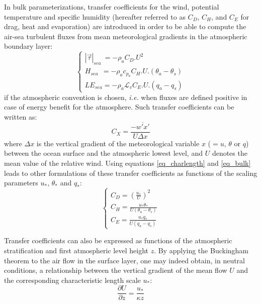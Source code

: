In bulk parameterizations, transfer coefficients for the wind, potential temperature and specific humidity 
(hereafter referred to as $C_{D}$, $C_{H}$, and $C_{E}$ for drag, heat and evaporation) are introduced in order 
to be able to compute the air-sea turbulent fluxes from mean meteorological gradients in the atmospheric boundary layer:
\begin{equation}
\left\{
\begin{array}{l}
	|\vec{\tau}|_{sea}~=-\rho_{a}C_{D}.U^{2}\\
	H_{sea}~~=-\rho_{a}c_{p_{a}}C_{H}.U.(\theta_{a}-\theta_{s})\\
	LE_{sea}=-\rho_{a}\mathcal{L}_{v}C_{E}.U.(q_{a}-q_{s})
\end{array}
\right.
\label{eq_bulk}\end{equation}
if the atmospheric convention is chosen, \textit{i.e.} when fluxes are defined positive in case of energy benefit for the atmosphere. 
Such transfer coefficients can be written as: 
\begin{equation}
C_{X}= \frac{-\overline{w'x'}}{U \Delta x}
\end{equation}
where $\Delta x$ is the vertical gradient of the meteorological variable $x$ ($=u$, $\theta$ or $q$) between the ocean surface and 
the atmospheric lowest level, and $U$ denotes the mean value of the relative wind.
Using equations \ref{eq_charlength} and \ref{eq_bulk} leads to other formulations of these transfer coefficients as functions of
the scaling parameters $u_*$, ${\theta}_*$ and $q_*$:
\begin{equation}
\left\{
\begin{array}{l}
C_{D}=\left(\frac{u_{*}}{U}\right)^{2}\\
C_{H}=\frac{u_{*}\theta_{*}}{U(\theta_{a}- \theta_{s})}\\
C_{E}=\frac{u_{*}q_{*}}{U(q_{a} -q_{s})}
\end{array}
\right.
\label{eq_COEF}\end{equation}

Transfer coefficients can also be expressed as functions of the atmospheric stratification and first atmospheric level height $z$. 
By applying the Buckingham theorem to the air flow in the surface layer, one may indeed obtain, in neutral conditions, a relationship 
between the vertical gradient of the mean flow $U$ and the corresponding characteristic length scale $u_{*}$:
\begin{equation}
\frac{\partial U}{\partial z}=\frac{u_{*}}{\kappa z}
\end{equation}

